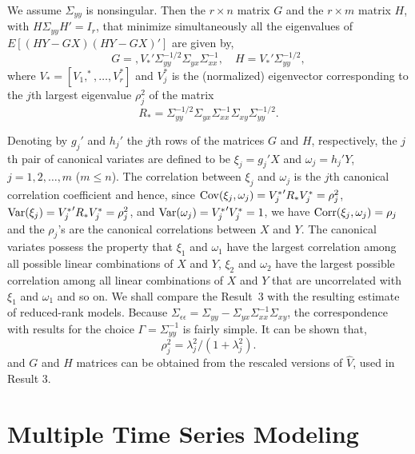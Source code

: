 \begin{result}\label{res:4} We assume $\Sigma_{yy}$ is nonsingular. Then the $r \times n$ matrix $G$ and the $r \times m$ matrix $H$, with $H \Sigma_{yy}H'=I_r$, that minimize simultaneously all the eigenvalues of $E[(HY-GX)(HY-GX)']$ are given by,
	\begin{equation}
	G=, V_*' \Sigma_{yy}^{-1/2} \Sigma_{yx} \Sigma_{xx}^{-1},\quad H=V_*' \Sigma_{yy}^{-1/2},
	\end{equation}
where $V_*=[V_1,^*,\ldots,V_r^*]$ and $V_j^*$ is the (normalized) eigenvector corresponding to the $j$th largest eigenvalue $\rho_j^2$ of the matrix
	\begin{equation}\label{eqn:eigenlargestmatrix}
	R_*=\Sigma_{yy}^{-1/2} \Sigma_{yx} \Sigma_{xx}^{-1} \Sigma_{xy} \Sigma_{yy}^{-1/2}.
	\end{equation}
\end{result}


Denoting by $g_j'$ and $h_j'$ the $j$th rows of the matrices $G$ and $H$, respectively, the $j$th pair of canonical variates are defined to be $\xi_j=g_j'X$ and $\omega_j=h_j'Y$, $j=1,2,\ldots,m$ ($m \leq n$). The correlation between $\xi_j$ and $\omega_j$ is the $j$th canonical correlation coefficient and hence, since $\operatorname{Cov}(\xi_j,\omega_j)={V_j^*}' R_*V_j^*=\rho_j^2$, $\operatorname{Var}(\xi_j)={V_j^*}' R_*V_j^*=\rho_j^2$, and $\operatorname{Var}(\omega_j)={V_j^*}' V_j^*=1$, we have $\operatorname{Corr}(\xi_j,\omega_j)=\rho_j$ and the $\rho_j$'s are the canonical correlations between $X$ and $Y$. The canonical variates possess the property that $\xi_1$ and $\omega_1$ have the largest correlation among all possible linear combinations of $X$ and $Y$, $\xi_2$ and $\omega_2$ have the largest possible correlation among all linear combinations of $X$ and $Y$ that are uncorrelated with $\xi_1$ and $\omega_1$ and so on. We shall compare the Result~3 with the resulting estimate of reduced-rank models. Because $\Sigma_{\epsilon\epsilon}=\Sigma_{yy}-\Sigma_{yx}\Sigma_{xx}^{-1}\Sigma_{xy}$, the correspondence with results for the choice $\Gamma=\Sigma_{yy}^{-1}$ is fairly simple. It can be shown that,
	\begin{equation}\label{eqn:rhojsqlambj}
	\rho_j^2=\lambda_j^2/(1+\lambda_j^2).
	\end{equation}
and $G$ and $H$ matrices can be obtained from the rescaled versions of $\hat{V}$, used in Result 3. 


\section{Multiple Time Series Modeling}



